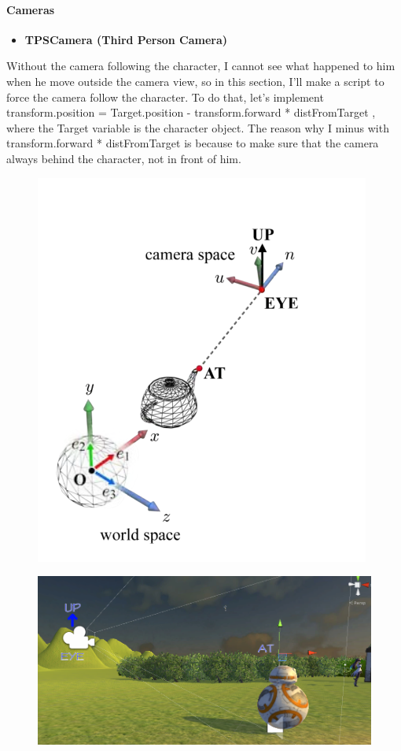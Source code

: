 \documentclass[a4paper, 13pt]{extarticle}
\begin{document}
 	 \paragraph{Cameras}
 	 \begin{itemize}
 	 	\item \bfseries TPSCamera (Third Person Camera) 
 	 \end{itemize}
 	 
 	 Without the camera following the character, I cannot see what happened to him when he move outside the camera view, so in this section, I'll make a script to force the camera follow the character. To do that, let's implement transform.position = Target.position - transform.forward * distFromTarget , where the Target variable is the character object. The reason why I minus with transform.forward * distFromTarget is because to make sure that the camera always behind the character, not in front of him. 
 	 \begin{figure}[h]
 	 	\centering
 	 	\begin{minipage}{.4\textwidth}
 	 		\centering
 	 		\includegraphics[width=0.7\linewidth]{intructions/camera_space.png}
 	 			\centering
 	 		\label{fig:test6}
 	 	\end{minipage}
  		\begin{minipage}{.4\textwidth}
  			\centering
  			\includegraphics[width=1.2\linewidth]{intructions/my_camera_space.png}
  			\label{fig:test7}
  		\end{minipage}
 	 \end{figure}  
\end{document}
